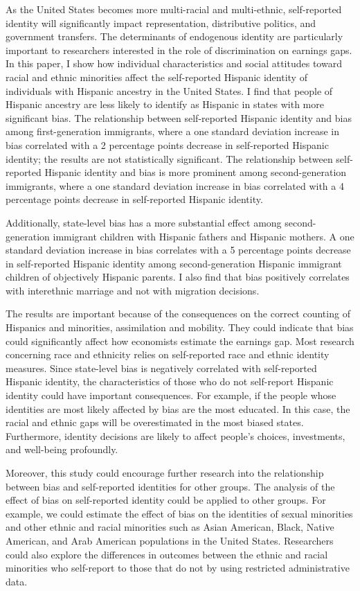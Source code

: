 \documentclass[12pt,english]{article}
\begin{document}
As the United States becomes more multi-racial and multi-ethnic, self-reported identity will significantly impact representation, distributive politics, and government transfers. The determinants of endogenous identity are particularly important to researchers interested in the role of discrimination on earnings gaps. In this paper, I show how individual characteristics and social attitudes toward racial and ethnic minorities affect the self-reported Hispanic identity of individuals with Hispanic ancestry in the United States. I find that people of Hispanic ancestry are less likely to identify as Hispanic in states with more significant bias. The relationship between self-reported Hispanic identity and bias among first-generation immigrants, where a one standard deviation increase in bias correlated with a 2 percentage points decrease in self-reported Hispanic identity; the results are not statistically significant. The relationship between self-reported Hispanic identity and bias is more prominent among second-generation immigrants, where a one standard deviation increase in bias correlated with a 4 percentage points decrease in self-reported Hispanic identity. 

Additionally, state-level bias has a more substantial effect among second-generation immigrant children with Hispanic fathers and Hispanic mothers. A one standard deviation increase in bias correlates with a 5 percentage points decrease in self-reported Hispanic identity among second-generation Hispanic immigrant children of objectively Hispanic parents. I also find that bias positively correlates with interethnic marriage and not with migration decisions.

The results are important because of the consequences on the correct counting of Hispanics and minorities, assimilation and mobility. They could indicate that bias could significantly affect how economists estimate the earnings gap. Most research concerning race and ethnicity relies on self-reported race and ethnic identity measures. Since state-level bias is negatively correlated with self-reported Hispanic identity, the characteristics of those who do not self-report Hispanic identity could have important consequences. For example, if the people whose identities are most likely affected by bias are the most educated. In this case, the racial and ethnic gaps will be overestimated in the most biased states. Furthermore, identity decisions are likely to affect people's choices, investments, and well-being profoundly. 

Moreover, this study could encourage further research into the relationship between bias and self-reported identities for other groups. The analysis of the effect of bias on self-reported identity could be applied to other groups. For example, we could estimate the effect of bias on the identities of sexual minorities and other ethnic and racial minorities such as Asian American, Black, Native American, and Arab American populations in the United States. Researchers could also explore the differences in outcomes between the ethnic and racial minorities who self-report to those that do not by using restricted administrative data. 
\end{document}
